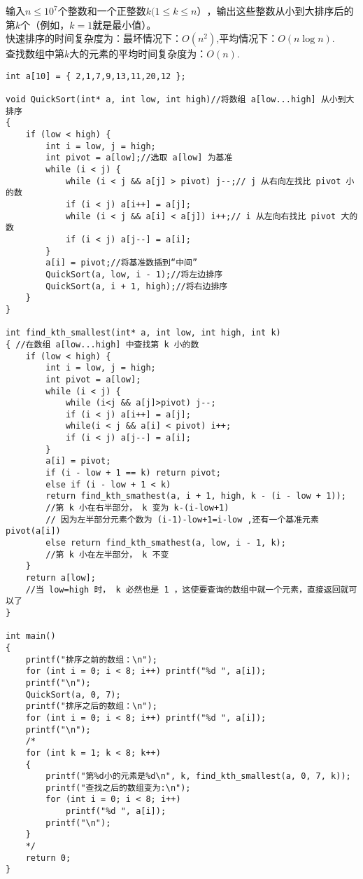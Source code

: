 输入$n\leq 10^ 7$个整数和一个正整数$k(1\leq k\leq n）$，输出这些整数从小到大排序后的第$k$个（例如，$k=1$就是最小值）。\\
快速排序的时间复杂度为：最坏情况下：$O(n^2)$,平均情况下：$O(n\log n)$. \\
查找数组中第$k$大的元素的平均时间复杂度为：$O(n)$.
\begin{lstlisting}
int a[10] = { 2,1,7,9,13,11,20,12 };

void QuickSort(int* a, int low, int high)//将数组 a[low...high] 从小到大排序
{
    if (low < high) {
        int i = low, j = high;
        int pivot = a[low];//选取 a[low] 为基准
        while (i < j) {
            while (i < j && a[j] > pivot) j--;// j 从右向左找比 pivot 小的数
            if (i < j) a[i++] = a[j];
            while (i < j && a[i] < a[j]) i++;// i 从左向右找比 pivot 大的数
            if (i < j) a[j--] = a[i];
        }
        a[i] = pivot;//将基准数插到“中间”
        QuickSort(a, low, i - 1);//将左边排序
        QuickSort(a, i + 1, high);//将右边排序
    }
}

int find_kth_smallest(int* a, int low, int high, int k)
{ //在数组 a[low...high] 中查找第 k 小的数
    if (low < high) {
        int i = low, j = high;
        int pivot = a[low];
        while (i < j) {
            while (i<j && a[j]>pivot) j--;
            if (i < j) a[i++] = a[j];
            while(i < j && a[i] < pivot) i++;
            if (i < j) a[j--] = a[i];
        }
        a[i] = pivot;
        if (i - low + 1 == k) return pivot;
        else if (i - low + 1 < k)
        return find_kth_smathest(a, i + 1, high, k - (i - low + 1));
        //第 k 小在右半部分， k 变为 k-(i-low+1)
        // 因为左半部分元素个数为 (i-1)-low+1=i-low ,还有一个基准元素 pivot(a[i])
        else return find_kth_smathest(a, low, i - 1, k);
        //第 k 小在左半部分， k 不变
    }
    return a[low];
    //当 low=high 时， k 必然也是 1 ，这使要查询的数组中就一个元素，直接返回就可以了
}

int main()
{
    printf("排序之前的数组：\n");
    for (int i = 0; i < 8; i++) printf("%d ", a[i]);
    printf("\n");
    QuickSort(a, 0, 7);
    printf("排序之后的数组：\n");
    for (int i = 0; i < 8; i++) printf("%d ", a[i]);
    printf("\n");
    /*
    for (int k = 1; k < 8; k++)
    {
        printf("第%d小的元素是%d\n", k, find_kth_smallest(a, 0, 7, k));
        printf("查找之后的数组变为:\n");
        for (int i = 0; i < 8; i++)
            printf("%d ", a[i]);
        printf("\n");
    }
    */
    return 0;
}
\end{lstlisting}

